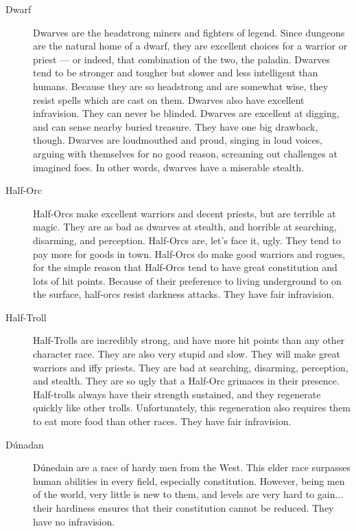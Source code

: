 \begin{description}
\item[Dwarf] Dwarves are the headstrong miners and fighters of legend.
     Since dungeons are the natural home of a dwarf, they are
     excellent choices for a warrior or priest --- or indeed, that
     combination of the two, the paladin. Dwarves tend to be
     stronger and tougher but slower and less intelligent than
     humans. Because they are so headstrong and are somewhat wise,
     they resist spells which are cast on them. Dwarves also have
     excellent infravision. They can never be blinded. Dwarves
     are excellent at digging, and can sense nearby buried treasure.
     They have one big drawback, though. Dwarves are loudmouthed and
     proud, singing in loud voices, arguing with themselves for no
     good reason, screaming out challenges at imagined foes. In
     other words, dwarves have a miserable stealth.

\item[Half-Orc] Half-Orcs make excellent warriors and decent priests, but
     are terrible at magic. They are as bad as dwarves at stealth,
     and horrible at searching, disarming, and perception.
     Half-Orcs are, let's face it, ugly. They tend to pay more for
     goods in town. Half-Orcs do make good warriors and rogues,
     for the simple reason that Half-Orcs tend to have great
     constitution and lots of hit points. Because of their
     preference to living underground to on the surface, half-orcs
     resist darkness attacks. They have fair infravision.

\item[Half-Troll] Half-Trolls are incredibly strong, and have more hit points
     than any other character race. They are also very stupid and
     slow. They will make great warriors and iffy priests. They
     are bad at searching, disarming, perception, and stealth.
     They are so ugly that a Half-Orc grimaces in their presence.
     Half-trolls always have their strength sustained, and they
     regenerate quickly like other trolls. Unfortunately, this
     regeneration also requires them to eat more food than other
     races. They have fair infravision.

\item[D\'{u}nadan] D\'{u}nedain are a race of hardy men from the West. This elder
     race surpasses human abilities in every field, especially
     constitution. However, being men of the world, very little is
     new to them, and levels are very hard to gain... their
     hardiness ensures that their constitution cannot be reduced.
     They have no infravision.


\end{description}

